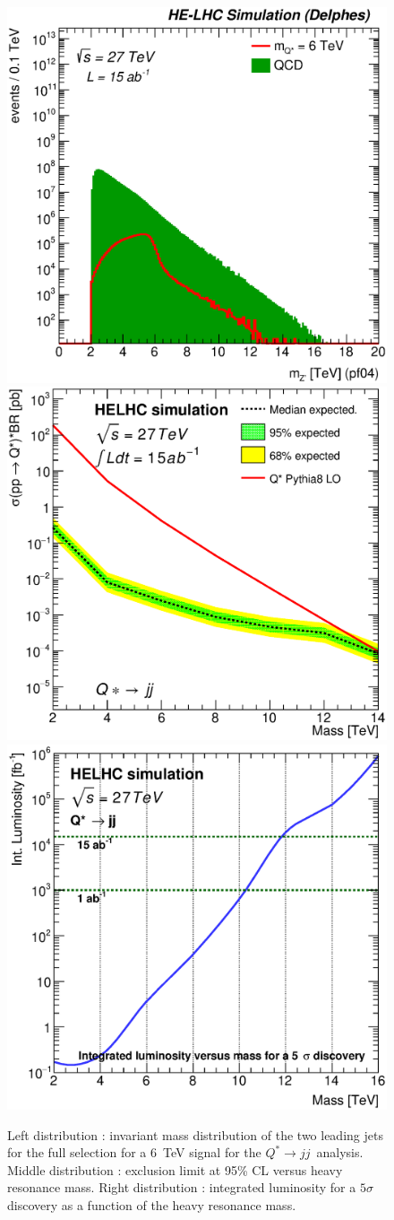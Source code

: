 \documentclass{cernrep}
\newcommand*{\qjj}{\ensuremath{Q^{*} \rightarrow jj}}
\begin{document}
\begin{figure}[!htb]
  \centering
  \includegraphics[width=0.30\columnwidth]{Fig/27tev/qq_Mj1j2_pf04_sel1_nostack_log.eps}
  \includegraphics[width=0.30\columnwidth]{Fig/27tev/lim_Qstar_jj_helhc_v01.eps}
  \includegraphics[width=0.30\columnwidth]{Fig/27tev/DiscoveryPotential_jj_rootStyle.eps}
  \caption{Left distribution : invariant mass distribution of the two leading jets for the full selection for a 6~TeV signal for the \qjj\ analysis. Middle distribution : exclusion limit at 95\% CL versus heavy resonance mass. Right distribution : integrated luminosity for a $5\sigma$ discovery as a function of the heavy resonance mass.}
  \label{figure:hadronicresonances27:qqsel01}
\end{figure}

\begin{table}[!htb]\centering
{}
\caption{Final yield of analysis.}
\label{tab:qqYield27}
\end{table}

\clearpage
\newpage



\end{document}
